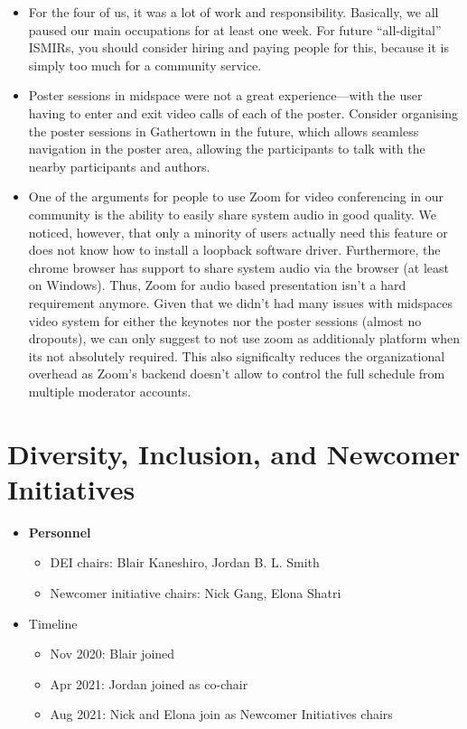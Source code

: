 \documentclass[%
10pt,								%
titlepage,						%
]
{scrartcl}
\begin{document}
\begin{itemize}
    \item For the four of us, it was a lot of work and responsibility. Basically, we all paused our main occupations for at least one week. For future ``all-digital'' ISMIRs, you should consider hiring and paying people for this, because it is simply too much for a community service.
    \item Poster sessions in midspace were not a great experience---with the user having to enter and exit video calls of each of the poster. Consider organising the poster sessions in Gathertown in the future, which allows seamless navigation in the poster area, allowing the participants to talk with the nearby participants and authors.
    \item One of the arguments for people to use Zoom for video conferencing in our community is the ability to easily share system audio in good quality. We noticed, however, that only a minority of users actually need this feature or does not know how to install a loopback software driver. Furthermore, the chrome browser has support to share system audio via the browser (at least on Windows). Thus, Zoom for audio based presentation isn't a hard requirement anymore. Given that we didn't had many issues with midspaces video system for either the keynotes nor the poster sessions (almost no dropouts), we can only suggest to not use zoom as additionaly platform when its not absolutely required. This also significalty reduces the organizational overhead as Zoom's backend doesn't allow to control the full schedule from multiple moderator accounts.
\end{itemize}

\section{Diversity, Inclusion, and Newcomer Initiatives}
    \begin{itemize}
        \item \textbf{Personnel}
            \begin{itemize}
                \item   DEI chairs: Blair Kaneshiro, Jordan B. L. Smith
                \item   Newcomer initiative chairs: Nick Gang, Elona Shatri
            \end{itemize}
        \item   Timeline
            \begin{itemize}
                \item   Nov 2020: Blair joined 
                \item   Apr 2021: Jordan joined as co-chair
                \item   Aug 2021: Nick and Elona join as Newcomer Initiatives chairs
            \end{itemize}
    \end{itemize}
    
\end{document}
